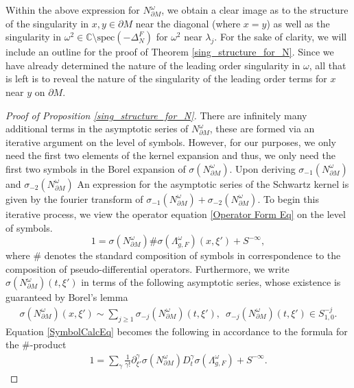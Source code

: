 \documentclass[12pt,a4paper]{amsart}
\numberwithin{equation}{section}
\theoremstyle{plain}
\theoremstyle{definition}
\begin{document}
Within the above expression for $N^\omega_{\partial M}$, we obtain a clear image as to the structure of the singularity in \(x,y\in \partial M\) near the diagonal (where \(x=y\)) as well as the singularity in \(\omega^2\in \mathbb{C}\setminus \mathrm{spec}(-\Delta_N^F)\) for $\omega^2$ near $\lambda_j$. For the sake of clarity, we will include an outline for the proof of Theorem \ref{sing_structure_for_N}. Since we have already determined the nature of the leading order singularity in $\omega$, all that is left is to reveal the nature of the singularity of the leading order terms for \(x\) near \(y\) on \(\partial M\). 
\begin{proof}[Proof of Proposition \ref{sing_structure_for_N}]
	There are infinitely many additional terms in the asymptotic series of $N^\omega_{\partial M}$, these are formed via an iterative argument on the level of symbols. However, for our purposes, we only need the first two elements of the kernel expansion and thus, we only need the first two symbols in the Borel expansion of $\sigma(N^\omega_{\partial M})$. Upon deriving $\sigma_{-1}(N^\omega_{\partial M})$ and $\sigma_{-2}(N^\omega_{\partial M})$ An expression for the asymptotic series of the Schwartz kernel is given by the fourier transform of $\sigma_{-1}(N^\omega_{\partial M})+\sigma_{-2}(N^\omega_{\partial M})$. To begin this iterative process, we view the operator equation \eqref{Operator Form Eq} on the level of symbols. 
		\begin{equation}
			1 = \sigma(N^\omega_{\partial M})\#\sigma(\Lambda_{g,F}^\omega)(x,\xi') + S^{-\infty}, \label{SymbolCalcEq}
		\end{equation}
		where $\#$ denotes the standard composition of symbols in correspondence to the composition of pseudo-differential operators. Furthermore, we write $\sigma(N^\omega_{\partial M})(t,\xi')$ in terms of the following asymptotic series, whose existence is guaranteed by Borel's lemma
		\begin{align*}
			\sigma(N^\omega_{\partial M})(x,\xi') \sim \sum_{j\geq 1} \sigma_{-j}(N^\omega_{\partial M})(t,\xi'), \;\ \sigma_{-j}(N^\omega_{\partial M})(t,\xi') \in S^{-j}_{1,0}.
		\end{align*}
		Equation \eqref{SymbolCalcEq} becomes the following in accordance to the formula for the $\#$-product
		\begin{align*}
			1 = \sum_{\gamma}\frac{1}{\gamma!}\partial_{\xi'}^\gamma \sigma(N^\omega_{\partial M}) D_t^\gamma \sigma(\Lambda_{g,F}^\omega) + S^{-\infty}.
		\end{align*} 

\end{proof}
\end{document}
